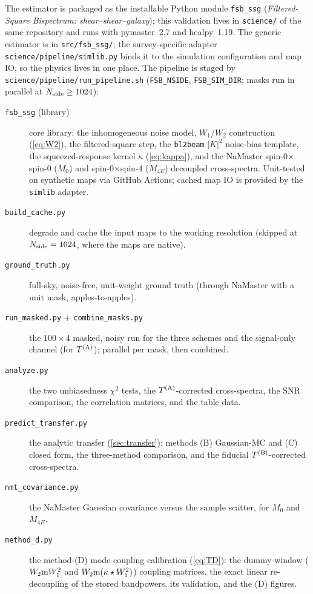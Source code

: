 \documentclass[11pt]{article}
\newcommand{\Wone}{W_1}
\newcommand{\Wtwo}{W_2}
\begin{document}
The estimator is packaged as the installable Python module \texttt{fsb\_ssg}
(\emph{Filtered-Square Bispectrum: shear--shear--galaxy}); this validation lives
in \texttt{science/} of the same repository and runs with pymaster~2.7 and
healpy~1.19. The generic estimator is in \texttt{src/fsb\_ssg/}; the
survey-specific adapter \texttt{science/pipeline/simlib.py} binds it to the
simulation configuration and map IO, so the physics lives in one place. The
pipeline is staged by \texttt{science/pipeline/run\_pipeline.sh}
(\texttt{FSB\_NSIDE}, \texttt{FSB\_SIM\_DIR}; masks run in parallel at
$N_{\rm side}\ge1024$):
\begin{description}
\item[\texttt{fsb\_ssg} (library)] core library: the inhomogeneous
noise model, $\Wone$/$\Wtwo$ construction (\cref{eq:W2}), the filtered-square
step, the \texttt{bl2beam} $|K|^2$ noise-bias template, the squeezed-response
kernel $\kappa$ (\cref{eq:kappa}), and the NaMaster spin-0$\times$spin-0 ($M_0$)
and spin-0$\times$spin-4 ($M_{4E}$) decoupled cross-spectra. Unit-tested on
synthetic maps via GitHub Actions; cached map IO is provided by the
\texttt{simlib} adapter.
\item[\texttt{build\_cache.py}] degrade and cache the input maps to the working
resolution (skipped at $N_{\rm side}=1024$, where the maps are native).
\item[\texttt{ground\_truth.py}] full-sky, noise-free, unit-weight ground truth
(through NaMaster with a unit mask, apples-to-apples).
\item[\texttt{run\_masked.py} + \texttt{combine\_masks.py}] the $100\times4$
masked, noisy run for the three schemes and the signal-only channel (for
$T^{\rm (A)}$); parallel per mask, then combined.
\item[\texttt{analyze.py}] the two unbiasedness $\chi^2$ tests, the
$T^{\rm (A)}$-corrected cross-spectra, the SNR comparison, the correlation
matrices, and the table data.
\item[\texttt{predict\_transfer.py}] the analytic transfer (\cref{sec:transfer}):
methods (B) Gaussian-MC and (C) closed form, the three-method comparison, and the
fiducial $T^{\rm (B)}$-corrected cross-spectra.
\item[\texttt{nmt\_covariance.py}] the NaMaster Gaussian covariance versus the
sample scatter, for $M_0$ and $M_{4E}$.
\item[\texttt{method\_d.py}] the method-(D) mode-coupling calibration
(\cref{eq:TD}): the dummy-window ($\Wtwo{\rm m}\Wone^2$ and
$\Wtwo{\rm m}(\kappa\star\Wone^2)$) coupling matrices, the exact linear
re-decoupling of the stored bandpowers, its validation, and the (D) figures.
\end{description}
\end{document}
